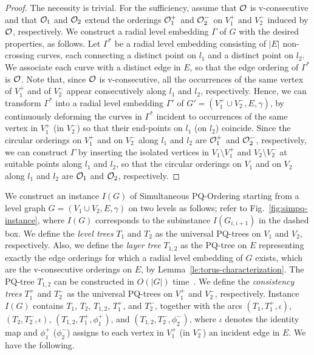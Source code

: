 \documentclass{llncs}
\begin{document}
\begin{proof}
The necessity is trivial. 
For the sufficiency, assume that $\cal O$ is v-consecutive and that ${\cal O}_1$ and ${\cal O}_2$ extend the orderings ${\cal O}^+_1$ and ${\cal O}^-_2$ on $V_1^+$ and $V_2^-$ induced by $\cal O$, respectively.
We construct a radial level embedding $\Gamma$ of $G$ with the desired properties, as follows. Let $\Gamma^*$ be a radial level embedding consisting of $|E|$ non-crossing curves, each connecting a distinct point on $l_1$ and a distinct point on $l_2$. We associate each curve with a distinct edge in $E$, so that the edge ordering of $\Gamma^*$ is $\cal O$. Note that, since $\cal O$ is v-consecutive, all the occurrences of the same vertex of $V^+_1$ and of $V_2^-$ appear consecutively along $l_1$ and $l_2$, respectively. Hence, we can transform $\Gamma^*$ into a radial level embedding $\Gamma'$ of
$G'=(V_1^+ \cup V_2^-, E, \gamma)$, by continuously deforming the curves in $\Gamma^*$ incident to occurrences of the same vertex in $V_1^+$ (in $V_2^-$) so that their end-points on $l_1$ (on $l_2$) coincide. Since the circular orderings on $V_1^+$ and on $V_2^-$ along $l_1$ and $l_2$ are ${\cal O}^+_1$ and ${\cal O}^-_2$, respectively, we can construct $\Gamma$ by inserting the isolated vertices in $V_1 \setminus V_1^+$ and $V_2 \setminus V_2^-$ at suitable points along $l_1$ and $l_2$, so that the circular orderings on $V_1$ and on $V_2$ along $l_1$ and $l_2$ are ${\cal O}_1$ and ${\cal O}_2$, respectively.
\end{proof}


We construct an instance $I(G)$ of {\sc Simultaneous PQ-Ordering} starting from a level graph $G=(V_1 \cup V_2,E,\gamma)$ on two levels as follows; refer to Fig.~\ref{fig:simpq-instance}, where $I(G)$ corresponds to the subinstance $I(G_{i,i+1})$ in the dashed box.
We define the {\em level trees} $T_1$ and $T_2$ as the universal PQ-trees on $V_1$ and $V_2$, respectively. 
Also, we define the {\em layer tree} $T_{1,2}$ as the PQ-tree on $E$ representing exactly the edge orderings for which a radial level embedding of $G$ exists, which are the v-consecutive orderings on $E$, by Lemma~\ref{le:torus-characterization}. 
The PQ-tree $T_{1,2}$ can be constructed in $O(|G|)$ time~\cite{bl-tcop-76,hm-ppp-04}.
We define the {\em consistency trees} $T_1^+$ and $T_2^-$ as the universal PQ-trees on $V_1^+$ and $V_2^-$, respectively.
Instance $I(G)$ contains $T_1$, $T_2$, $T_{1,2}$, $T_1^+$, and $T_2^-$, together with the arcs $(T_1, T_1^+, \iota)$,
$(T_2, T_2^-, \iota)$,
$(T_{1,2}, T_1^+, \phi_1^+)$,
 and $(T_{1,2}, T_2^-, \phi_{2}^-)$, where $\iota$ denotes the identity map and $\phi_1^+$  ($\phi_2^-$) assigns to each vertex in $V_1^+$ (in $V_2^-$) an incident edge in $E$. We have the following.
\end{document}
